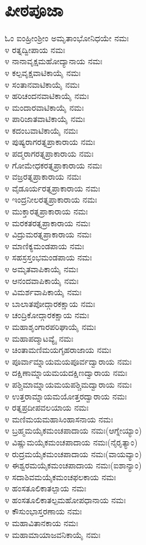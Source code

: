 \section{ಪೀಠಪೂಜಾ}
ಓಂ ಐಂಹ್ರೀಂಶ್ರೀಂ ಅಮೃತಾಂಭೋನಿಧಯೇ ನಮಃ\\
೪ ರತ್ನದ್ವೀಪಾಯ ನಮಃ\\
೪ ನಾನಾವೃಕ್ಷಮಹೋದ್ಯಾನಾಯ ನಮಃ\\
೪ ಕಲ್ಪವೃಕ್ಷವಾಟಿಕಾಯೈ ನಮಃ\\
೪ ಸಂತಾನವಾಟಿಕಾಯೈ ನಮಃ\\
೪ ಹರಿಚಂದನವಾಟಿಕಾಯೈ ನಮಃ\\
೪ ಮಂದಾರವಾಟಿಕಾಯೈ ನಮಃ\\
೪ ಪಾರಿಜಾತವಾಟಿಕಾಯೈ ನಮಃ\\
೪ ಕದಂಬವಾಟಿಕಾಯೈ ನಮಃ\\
೪ ಪುಷ್ಯರಾಗರತ್ನಪ್ರಾಕಾರಾಯ ನಮಃ\\
೪ ಪದ್ಮರಾಗರತ್ನಪ್ರಾಕಾರಾಯ ನಮಃ\\
೪ ಗೋಮೇಧಕರತ್ನಪ್ರಾಕಾರಾಯ ನಮಃ\\
೪ ವಜ್ರರತ್ನಪ್ರಾಕಾರಾಯ ನಮಃ\\
೪ ವೈಡೂರ್ಯರತ್ನಪ್ರಾಕಾರಾಯ ನಮಃ\\
೪ ಇಂದ್ರನೀಲರತ್ನಪ್ರಾಕಾರಾಯ ನಮಃ\\
೪ ಮುಕ್ತಾರತ್ನಪ್ರಾಕಾರಾಯ ನಮಃ\\
೪ ಮರಕತರತ್ನಪ್ರಾಕಾರಾಯ ನಮಃ\\
೪ ವಿದ್ರುಮರತ್ನಪ್ರಾಕಾರಾಯ ನಮಃ\\
೪ ಮಾಣಿಕ್ಯಮಂಡಪಾಯ ನಮಃ\\
೪ ಸಹಸ್ರಸ್ತಂಭಮಂಡಪಾಯ ನಮಃ\\
೪ ಅಮೃತವಾಪಿಕಾಯೈ ನಮಃ\\
೪ ಆನಂದವಾಪಿಕಾಯೈ ನಮಃ\\
೪ ವಿಮರ್ಶವಾಪಿಕಾಯೈ ನಮಃ\\
೪ ಬಾಲಾತಪೋದ್ಗಾರಕಕ್ಷಾಯ ನಮಃ\\
೪ ಚಂದ್ರಿಕೋದ್ಗಾರಕಕ್ಷಾಯ ನಮಃ\\
೪ ಮಹಾಶೃಂಗಾರಪರಿಘಾಯೈ ನಮಃ\\
೪ ಮಹಾಪದ್ಮಾಟವ್ಯೈ ನಮಃ\\
೪ ಚಿಂತಾಮಣಿಮಯಗೃಹರಾಜಾಯ ನಮಃ\\
೪ ಪೂರ್ವಾಮ್ನಾಯಮಯಪೂರ್ವದ್ವಾರಾಯ ನಮಃ\\
೪ ದಕ್ಷಿಣಾಮ್ನಾಯಮಯದಕ್ಷಿಣದ್ವಾರಾಯ ನಮಃ\\
೪ ಪಶ್ಚಿಮಾಮ್ನಾಯಮಯಪಶ್ಚಿಮದ್ವಾರಾಯ ನಮಃ\\
೪ ಉತ್ತರಾಮ್ನಾಯಮಯೋತ್ತರದ್ವಾರಾಯ ನಮಃ\\
೪ ರತ್ನಪ್ರದೀಪವಲಯಾಯ ನಮಃ\\
೪ ಮಣಿಮಯಮಹಾಸಿಂಹಾಸನಾಯ ನಮಃ\\
೪ ಬ್ರಹ್ಮಮಯೈಕಮಂಚಪಾದಾಯ ನಮಃ(ಆಗ್ನೇಯ್ಯಾಂ)\\
೪ ವಿಷ್ಣುಮಯೈಕಮಂಚಪಾದಾಯ ನಮಃ(ನೈರೃತ್ಯಾಂ)\\
೪ ರುದ್ರಮಯೈಕಮಂಚಪಾದಾಯ ನಮಃ(ವಾಯವ್ಯಾಂ)\\
೪ ಈಶ್ವರಮಯೈಕಮಂಚಪಾದಾಯ ನಮಃ(ಐಶಾನ್ಯಾಂ)\\
೪ ಸದಾಶಿವಮಯೈಕಮಂಚಫಲಕಾಯ ನಮಃ\\
೪ ಹಂಸತೂಲಿಕಾತಲ್ಪಾಯ ನಮಃ\\
೪ ಹಂಸತೂಲಿಕಾತಲ್ಪಮಹೋಪಧಾನಾಯ ನಮಃ\\
೪ ಕೌಸುಂಭಾಸ್ತರಣಾಯ ನಮಃ\\
೪ ಮಹಾವಿತಾನಕಾಯ ನಮಃ\\
೪ ಮಹಾಮಾಯಾಜವನಿಕಾಯೈ ನಮಃ

